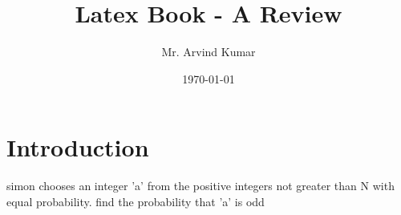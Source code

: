 \documentclass[a4paper,12pt]{book}
\begin{document}
	\title{Latex Book - A Review}
	\author{Mr. Arvind Kumar}
	\date{\today}
	\maketitle
	\tableofcontents
	\newpage
	\chapter{Introduction}
	simon chooses an integer 'a' from the positive integers not greater than N with equal probability. find the probability that 'a' is odd
	
\end{document}
